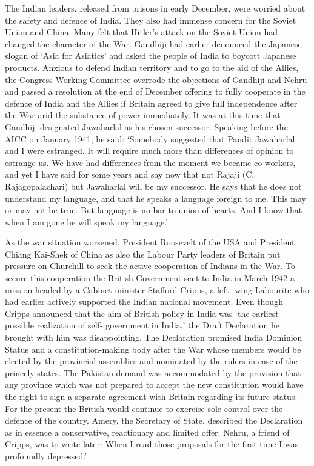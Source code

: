 The Indian leaders, released from prisons in early December, were worried about the safety and defence of India. They also had immense concern for the Soviet Union and China. Many felt that Hitler's attack on the Soviet Union had changed the character of the War. Gandhiji had earlier denounced the Japanese slogan of `Asia for Asiatics' and asked the people of India to boycott Japanese products. Anxious to defend Indian territory and to go to the aid of the Allies, the Congress Working Committee overrode the objections of Gandhiji and Nehru and passed a resolution at the end of December offering to fully cooperate in the defence of India and the Allies if Britain agreed to give full independence after the War arid the substance of power immediately. It was at this time that Gandhiji designated Jawaharlal as his chosen successor. Speaking before the AICC on January 1941, he said: `Somebody suggested that Pandit Jawaharlal and I were estranged. It will require much more than differences of opinion to estrange us. We have had differences from the moment we became co-workers, and yet I have said for some years and say now that not Rajaji (C. Rajagopalachari) but Jawaharlal will be my successor. He says that he does not understand my language, and that he speaks a language foreign to me. This may or may not be true. But language is no bar to union of hearts. And I know that when I am gone he will speak my language.' 

As the war situation worsened, President Roosevelt of the USA and President Chiang Kai-Shek of China as also the Labour Party leaders of Britain put pressure on Churchill to seek the active cooperation of Indians in the War. To secure this cooperation the British Government sent to India in March 1942 a mission headed by a Cabinet minister Stafford Cripps, a left- wing Labourite who had earlier actively supported the Indian national movement. Even though Cripps announced that the aim of British policy in India was `the earliest possible realization of self- government in India,' the Draft Declaration he brought with him was disappointing. The Declaration promised India Dominion Status and a constitution-making body after the War whose members would be elected by the provincial assemblies and nominated by the rulers in case of the princely states. The Pakistan demand was accommodated by the provision that any province which was not prepared to accept the new constitution would have the right to sign a separate agreement with Britain regarding its future status. For the present the British would continue to exercise sole control over the defence of the country. Amery, the Secretary of State, described the Declaration as in essence a conservative, reactionary and limited offer. Nehru, a friend of Cripps, was to write later: When I read those proposals for the first time I was profoundly depressed.' 

